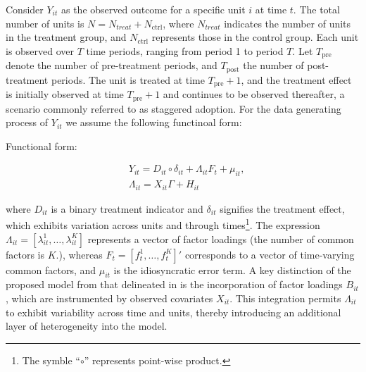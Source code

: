 \documentclass[12pt]{article}
\begin{document}
Consider $Y_{it}$ as the observed outcome for a specific unit $i$ at time $t$. The total number of units is $N = N_{treat} + N_{\text{ctrl}}$, where $N_{treat}$ indicates the number of units in the treatment group, and $N_{\text{ctrl}}$ represents those in the control group. Each unit is observed over $T$ time periods, ranging from period 1 to period $T$. Let $T_{\text{pre}}$ denote the number of pre-treatment periods, and $T_{\text{post}}$ the number of post-treatment periods. The unit is treated at time $T_{\text{pre}} + 1$, and the treatment effect is initially observed at time $T_{\text{pre}} + 1$ and continues to be observed thereafter, a scenario commonly referred to as staggered adoption. For the data generating process of $Y_{it}$ we assume the following functinoal form:

\begin{assumption}
Functional form:
\label{ass: function}
\end{assumption}

\begin{equation}
\begin{aligned}
& Y_{it} = D_{it} \circ \delta_{it} + \Lambda_{it}F_{t} + \mu_{it}, \\
& \Lambda_{it} = X_{it}\Gamma + H_{it}
\end{aligned}
\label{eqn: functional form}
\end{equation}

\noindent where $D_{it}$ is a binary treatment indicator and $\delta_{it}$ signifies the treatment effect, which exhibits variation across units and through times\footnote{The symble ``$\circ$'' represents point-wise product.}. The expression $\Lambda_{it} = [\lambda_{it}^1, \ldots, \lambda_{it}^K]$ represents a vector of factor loadings (the number of common factors is $K$.), whereas $F_{t} = [f_{t}^1, \ldots, f_{t}^K]'$ corresponds to a vector of time-varying common factors, and $\mu_{it}$ is the idiosyncratic error term. A key distinction of the proposed model from that delineated in \cite{xu2017generalized} is the incorporation of factor loadings $B_{it}$, which are instrumented by observed covariates $X_{it}$. This integration permits $\Lambda_{it}$ to exhibit variability across time and units, thereby introducing an additional layer of heterogeneity into the model.
\end{document}
